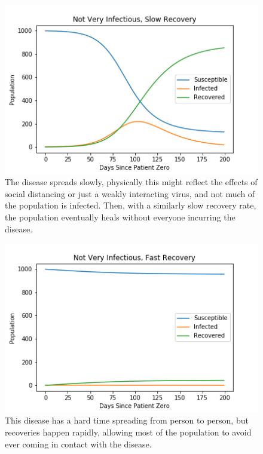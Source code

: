 \documentclass{article}
\begin{document}
\begin{figure}[H]
    \centering
    \captionsetup{justification=centering}
    \includegraphics[width=0.8\linewidth]{images/Ns.png}
    \caption{The disease spreads slowly, physically this might reflect the effects of social distancing or just a weakly interacting virus, and not much of the population is infected. Then, with a similarly slow recovery rate, the population eventually heals without everyone incurring the disease.}
    \label{fig:Ns}
\end{figure}
\begin{figure}[H]
    \centering
    \captionsetup{justification=centering}
    \includegraphics[width=0.8\linewidth]{images/NF.png}
    \caption{This disease has a hard time spreading from person to person, but recoveries happen rapidly, allowing most of the population to avoid ever coming in contact with the disease.}
    \label{fig:NF}
\end{figure}
\end{document}
